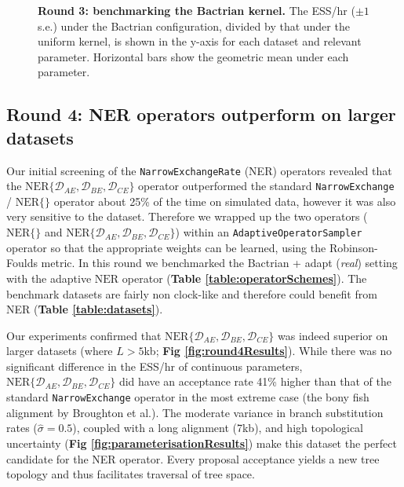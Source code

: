 \documentclass[10pt,letterpaper]{article}
\begin{document}
\begin{figure}[!h]
\caption{\textbf{Round 3: benchmarking the Bactrian kernel.}
The ESS/hr ($\pm 1$ s.e.) under the Bactrian configuration, divided by that under the uniform kernel, is shown in the y-axis for each dataset and relevant parameter.
Horizontal bars show the geometric mean under each parameter.
 }
\label{fig:round3Results}
\end{figure}




\subsection*{Round 4: NER operators outperform on larger datasets}


Our initial screening of the \texttt{NarrowExchangeRate} (NER) operators revealed that the $\text{NER}\{\mathcal{D}_{AE}, \mathcal{D}_{BE}, \mathcal{D}_{CE}\}$ operator outperformed the standard  \texttt{NarrowExchange} / $\text{NER} \{\}$ operator about 25\% of the time on simulated data, however it was also very sensitive to the dataset. 
Therefore we wrapped up the two operators ($\text{NER} \{\}$ and $\text{NER}\{\mathcal{D}_{AE}, \mathcal{D}_{BE}, \mathcal{D}_{CE}\}$) within an \texttt{AdaptiveOperatorSampler} operator so that the appropriate weights can be learned, using the Robinson-Foulds metric.
In this round we benchmarked the Bactrian + adapt (\textit{real}) setting with the adaptive $\text{NER}$ operator (\textbf{Table \ref{table:operatorSchemes}}).
The benchmark datasets are fairly non clock-like and therefore could benefit from NER (\textbf{Table \ref{table:datasets}}).   


Our experiments confirmed that $\text{NER}\{\mathcal{D}_{AE}, \mathcal{D}_{BE}, \mathcal{D}_{CE}\}$ was indeed superior on larger datasets (where $L > 5$kb; \textbf{Fig \ref{fig:round4Results}}).
While there was no significant difference in the ESS/hr of continuous parameters, $\text{NER}\{\mathcal{D}_{AE}, \mathcal{D}_{BE}, \mathcal{D}_{CE}\}$ did have an acceptance rate 41\% higher than that of the standard \texttt{NarrowExchange} operator in the most extreme case (the bony fish alignment by Broughton et al.\cite{Broughton_2013}).
The moderate variance in branch substitution rates ($\hat{\sigma} = 0.5$), coupled with a long alignment (7kb), and high topological uncertainty (\textbf{Fig \ref{fig:parameterisationResults}}) make this dataset the perfect candidate for the NER operator. 
Every proposal acceptance yields a new tree topology and thus facilitates traversal of tree space. 
\end{document}
